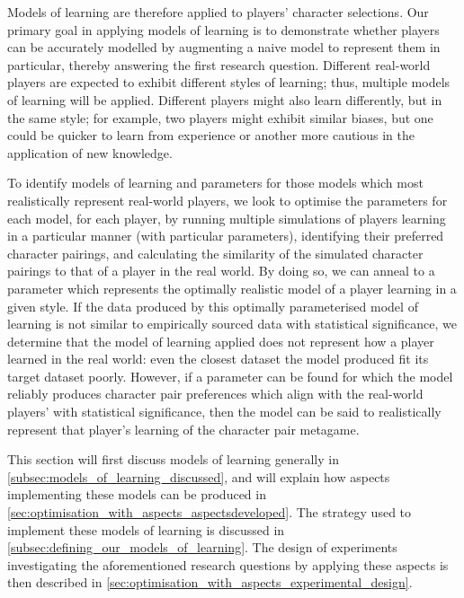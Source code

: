 Models of learning are therefore applied to players' character selections. Our
primary goal in applying models of learning is to demonstrate whether players
can be accurately modelled by augmenting a naive model to represent them in
particular, thereby answering the first research question. Different real-world
players are expected to exhibit different styles of learning; thus, multiple
models of learning will be applied. Different players might also learn
differently, but in the same style; for example, two players might exhibit
similar biases, but one could be quicker to learn from experience or another
more cautious in the application of new knowledge.

To identify models of learning and parameters for those models which most
realistically represent real-world players, we look to optimise the parameters
for each model, for each player, by running multiple simulations of players
learning in a particular manner (with particular parameters), identifying their
preferred character pairings, and calculating the similarity of the simulated
character pairings to that of a player in the real world. By doing so, we can
anneal to a parameter which represents the optimally realistic model of a player
learning in a given style. If the data produced by this optimally parameterised
model of learning is not similar to empirically sourced data with statistical
significance, we determine that the model of learning applied does not represent
how a player learned in the real world: even the closest dataset the model
produced fit its target dataset poorly. However, if a parameter can be found for
which the model reliably produces character pair preferences which align with
the real-world players' with statistical significance, then the model can be
said to realistically represent that player's learning of the character pair
metagame.

This section will first discuss models of learning generally in
\cref{subsec:models_of_learning_discussed}, and will explain how aspects
implementing these models can be produced in
\cref{sec:optimisation_with_aspects_aspectsdeveloped}. The strategy used to
implement these models of learning is discussed in
\cref{subsec:defining_our_models_of_learning}. The design of experiments
investigating the aforementioned research questions by applying these aspects is
then described in \cref{sec:optimisation_with_aspects_experimental_design}.


